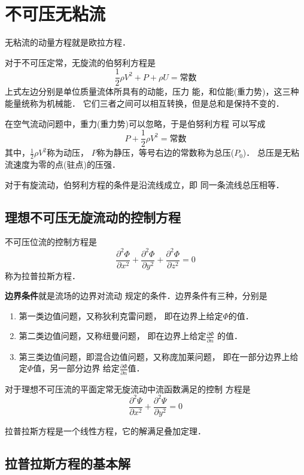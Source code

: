 
\chapter{不可压无粘流}
无粘流的动量方程就是欧拉方程．

对于不可压定常，无旋流的伯努利方程是
\[
	\frac{1}{2}\rho V^2+P +\rho U=
	\text{常数}
\]
上式左边分别是单位质量流体所具有的动能，压力
能，和位能(重力势)，这三种能量统称为机械能．
它们三者之间可以相互转换，但是总和是保持不变的．

\begin{notice}
	在空气流动问题中，重力(重力势)可以忽略，于是伯努利方程
	可以写成
	\[
		P+\frac{1}{2}\rho V^2=\text{常数}
	\]
	其中，$\frac{1}{2}\rho V^2$称为动压，
	$P$称为静压，等号右边的常数称为总压($P_0$)．
	总压是无粘流速度为零的点(驻点)的压强．
\end{notice}

对于有旋流动，伯努利方程的条件是沿流线成立，即
同一条流线总压相等．

\section{理想不可压无旋流动的控制方程}
不可压位流的控制方程是
\[
	\frac{\partial ^2 \Phi}{\partial x^2}+
	\frac{\partial ^2 \Phi}{\partial y^2}+
	\frac{\partial ^2 \Phi}{\partial z^2}=
  0 
\]
称为拉普拉斯方程．

{\bfseries 边界条件}就是流场的边界对流动
规定的条件．边界条件有三种，分别是
\begin{enumerate}
  \item 第一类边值问题，又称狄利克雷问题，
    即在边界上给定$\Phi$的值．
  \item 第二类边值问题，又称纽曼问题，
    即在边界上给定$\frac{\partial \Phi}{\partial n }$
    的值．
  \item 第三类边值问题，即混合边值问题，又称庞加莱问题，
    即在一部分边界上给定$\Phi$值，另一部分边界
    给定$\frac{\partial \Phi}{\partial n }$值． 
\end{enumerate}
对于理想不可压流的平面定常无旋流动中流函数满足的控制
方程是
\[
  \frac{\partial ^2 \Psi}{\partial x^2}+
  \frac{\partial ^2 \Psi }{\partial y^2}=
  0 
\]
\begin{note}
 拉普拉斯方程是一个线性方程，它的解满足叠加定理．
\end{note}

\section{拉普拉斯方程的基本解}

